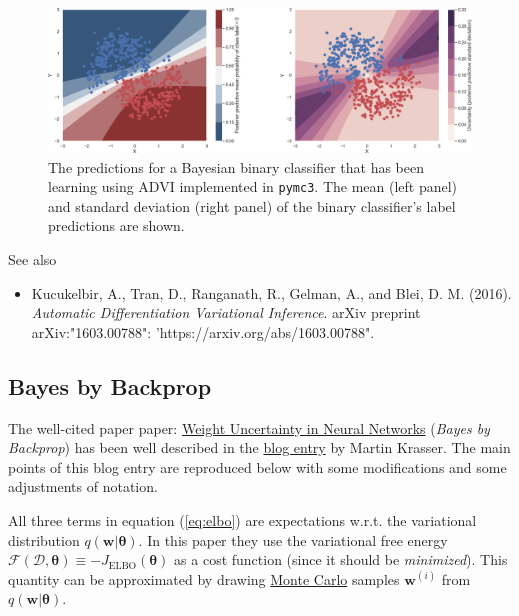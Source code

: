\documentclass[%
oneside,                 %
final,                   %
10pt]{article}
\begin{document}
\begin{figure}[!ht]  %
  \centerline{\includegraphics[width=0.95\linewidth]{fig/ADVI-classifier.png}}
  \caption{
  The predictions for a Bayesian binary classifier that has been learning using ADVI implemented in \texttt{pymc3}. The mean (left panel) and standard deviation (right panel) of the binary classifier's label predictions are shown.
  }
\end{figure}


See also 
\begin{itemize}
\item Kucukelbir, A., Tran, D., Ranganath, R., Gelman, A., and Blei, D. M. (2016). \emph{Automatic Differentiation Variational Inference}. arXiv preprint arXiv:"1603.00788": 'https://arxiv.org/abs/1603.00788".
\end{itemize}

\noindent
\subsection{Bayes by Backprop}

The well-cited paper paper: \href{{https://arxiv.org/abs/1505.05424}}{Weight Uncertainty in Neural Networks} (\emph{Bayes by Backprop}) has been well described in the \href{{http://krasserm.github.io/2019/03/14/bayesian-neural-networks/}}{blog entry} by Martin Krasser. The main points of this blog entry are reproduced below with some modifications and some adjustments of notation. 

All three terms in equation (\ref{eq:elbo}) are expectations w.r.t. the variational distribution $q(\boldsymbol{w} \lvert \boldsymbol{\theta})$. In this paper they use the variational free energy $\mathcal{F}(\mathcal{D},\boldsymbol{\theta}) \equiv -J_\mathrm{ELBO}(\boldsymbol{\theta})$ as a cost function (since it should be \emph{minimized}). This quantity can be approximated by drawing \href{{https://en.wikipedia.org/wiki/Monte_Carlo_method}}{Monte Carlo} samples $\boldsymbol{w}^{(i)}$ from $q(\boldsymbol{w} \lvert \boldsymbol{\theta})$.
\end{document}
